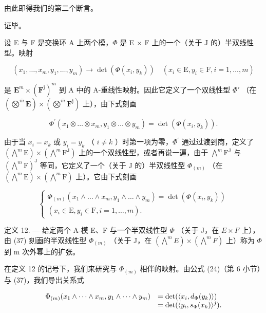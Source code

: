 由此即得我们的第二个断言。

证毕。

设 E 与 F 是交换环 A 上两个模，\(\Phi\) 是 E × F 上的一个（关于 J 的）半双线性型。映射

\[
(x _ {1}, \dots , x _ {m}, y _ {1}, \dots , y _ {m}) \rightarrow \det (\Phi (x _ {i}, y _ {k})) \quad (x _ {i} \in \mathrm{E}, y _ {i} \in \mathrm{F}, i = 1, \dots , m)
\]

是 \(\mathbf{E}^{m}\times(\mathbf{F}^{\mathrm{j}})^{m}\) 到 A 中的 A-重线性映射。因此它定义了一个双线性型 \(\Phi'\) （在 \((\bigotimes^{\overline{m}}\mathbf{E})\times(\bigotimes^{\overline{m}}\mathbf{F}^{\mathrm{j}})\) 上），由下式刻画

\[
\Phi^ {\prime} (x _ {1} \otimes \dots \otimes x _ {m}, y _ {1} \otimes \dots \otimes y _ {m}) = \det (\Phi (x _ {i}, y _ {k})).
\]

由于当 \(x_{i}=x_{k}\) 或 \(y_{i}=y_{k}\) （ \(i\neq k\) ）时第一项为零，\(\Phi^{\prime}\) 通过过渡到商，定义了 \((\bigwedge^{m}\mathrm{E})\times(\bigwedge^{m}\mathrm{F}^{\mathrm{J}})\) 上的一个双线性型，或者再说一遍，由于 \(\bigwedge^{m}\mathrm{F}^{\mathrm{J}}\) 与 \((\bigwedge^{m}\mathrm{F})^{\mathrm{J}}\) 等同，它定义了一个（关于 J 的）半双线性型 \(\Phi_{(m)}\) （在 \((\bigwedge^{m}\mathrm{E})\times(\bigwedge^{m}\mathrm{F})\) 上）。它由下式刻画

\[
\left\{ \begin{array}{l} \Phi_ {(m)} (x _ {1} \wedge \dots \wedge x _ {m}, y _ {1} \wedge \dots \wedge y _ {m}) = \det (\Phi (x _ {i}, y _ {k})) \\ (x _ {i} \in \mathrm{E}, y _ {i} \in \mathrm{F}, i = 1, \dots , m). \end{array} \right.\tag{37}
\]

定义 12. --- 给定两个 A-模 E、F 与一个半双线性型 \(\Phi\) （关于 J，在 \(E \times F\) 上），由 (37) 刻画的半双线性型 \(\Phi_{(m)}\) （关于 J，在 \((\bigwedge^{m} E) \times (\bigwedge^{m} F)\) 上）称为 \(\Phi\) 到 m 次外幂上的扩张。

在定义 12 的记号下，我们来研究与 \(\Phi_{(m)}\) 相伴的映射。由公式 (24)（第 6 小节）与 (37)，我们导出关系式

\[
\begin{array}{r l} \Phi_ {(m)} (x _ {1} \wedge \dots \wedge x _ {m}, y _ {1} \wedge \dots \wedge y _ {m}) & = \det (\langle x _ {i}, d _ {\Phi} (y _ {k}) \rangle) \\ & = \det (\langle y _ {i}, s _ {\Phi} (x _ {k}) \rangle^ {j}). \end{array}
\]

